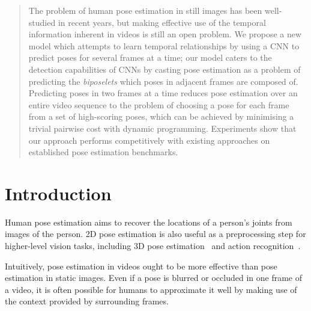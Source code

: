 \documentclass[runningheads]{llncs}
\begin{document}
%

\begin{abstract}
The problem of human pose estimation in still images has been well-studied in
recent years, but making effective use of the temporal information inherent in
videos is still an open problem. We propose a new model which attempts to learn
temporal relationships by using a CNN to predict poses for several frames at a
time; our model caters to the detection capabilities of CNNs by casting pose
estimation as a problem of predicting the \textit{biposelets} which poses in
adjacent frames are composed of. Predicting poses in two frames at a time
reduces pose estimation over an entire video sequence to the problem of choosing
a pose for each frame from a set of high-scoring poses, which can be achieved by
minimising a trivial pairwise cost with dynamic programming. Experiments show
that our approach performs competitively with existing approaches on established
pose estimation benchmarks.
\end{abstract}

\section{Introduction}

Human pose estimation aims to recover the locations of a person's joints from
images of the person. %
2D pose estimation is also useful as a preprocessing step for higher-level
vision tasks, including 3D pose
estimation~\cite{andriluka2010monocular,zhou2016spatio} and action
recognition~\cite{cheron2015p,yao2011does}.

Intuitively, pose estimation in videos ought to be more effective than pose
estimation in static images. Even if a pose is blurred or occluded in one frame
of a video, it is often possible for humans to approximate it well by making use
of the context provided by surrounding frames.
\end{document}
